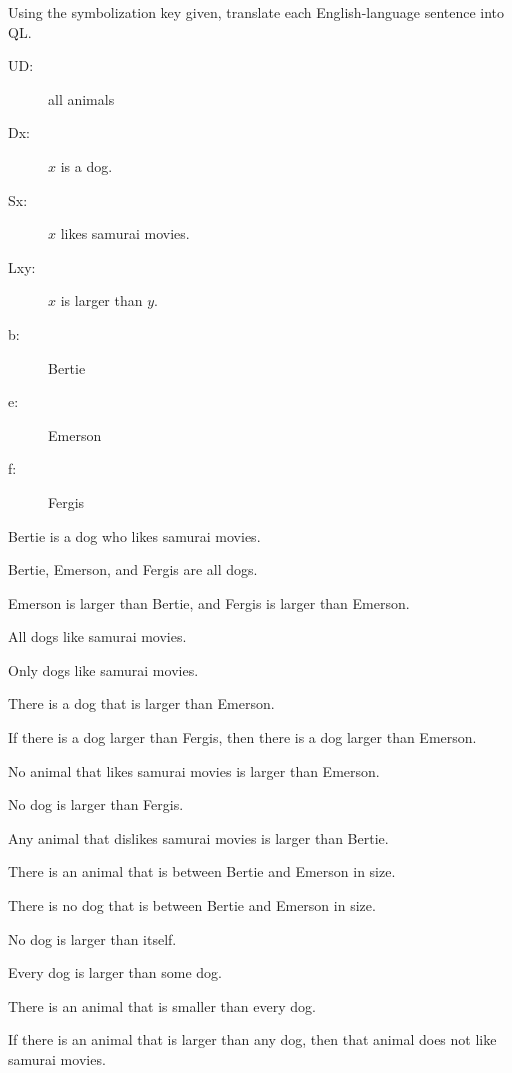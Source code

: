 \practiceproblems
\setlength{\parindent}{0em}
\problempart Using the symbolization key given, translate each English-language sentence into QL.
\begin{description}
\item[UD:] all animals
\item[Dx:] $x$ is a dog.
\item[Sx:] $x$ likes samurai movies.
\item[Lxy:] $x$ is larger than $y$.
\item[b:] Bertie
\item[e:] Emerson
\item[f:] Fergis
\end{description}
\begin{kormanize}
\item Bertie is a dog who likes samurai movies.
\item Bertie, Emerson, and Fergis are all dogs.
\item Emerson is larger than Bertie, and Fergis is larger than Emerson.
\item All dogs like samurai movies.
\item Only dogs like samurai movies.
\item There is a dog that is larger than Emerson.
\item If there is a dog larger than Fergis, then there is a dog larger than Emerson.
\item No animal that likes samurai movies is larger than Emerson.
\item No dog is larger than Fergis.
\item Any animal that dislikes samurai movies is larger than Bertie.
\item There is an animal that is between Bertie and Emerson in size.
\item There is no dog that is between Bertie and Emerson in size.
\item No dog is larger than itself.
\item Every dog is larger than some dog.
\item There is an animal that is smaller than every dog.
\item If there is an animal that is larger than any dog, then that animal does not like samurai movies.
\end{kormanize}


